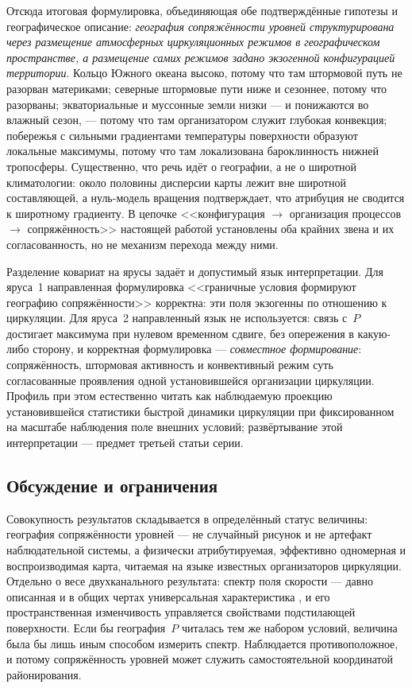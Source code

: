 \documentclass[11pt,a4paper]{article}
\begin{document}
Отсюда итоговая формулировка, объединяющая обе подтверждённые гипотезы и географическое описание: \emph{география сопряжённости уровней структурирована через размещение атмосферных циркуляционных режимов в географическом пространстве, а размещение самих режимов задано экзогенной конфигурацией территории}. Кольцо Южного океана высоко, потому что там штормовой путь не разорван материками; северные штормовые пути ниже и сезоннее, потому что разорваны; экваториальные и муссонные земли низки --- и понижаются во влажный сезон, --- потому что там организатором служит глубокая конвекция; побережья с сильными градиентами температуры поверхности образуют локальные максимумы, потому что там локализована бароклинность нижней тропосферы. Существенно, что речь идёт о географии, а не о широтной климатологии: около половины дисперсии карты лежит вне широтной составляющей, а нуль-модель вращения подтверждает, что атрибуция не сводится к широтному градиенту. В цепочке <<конфигурация $\to$ организация процессов $\to$ сопряжённость>> настоящей работой установлены оба крайних звена и их согласованность, но не механизм перехода между ними.

Разделение ковариат на ярусы задаёт и допустимый язык интерпретации. Для яруса~1 направленная формулировка <<граничные условия формируют географию сопряжённости>> корректна: эти поля экзогенны по отношению к циркуляции. Для яруса~2 направленный язык не используется: связь с~$P$ достигает максимума при нулевом временном сдвиге, без опережения в какую-либо сторону, и корректная формулировка --- \emph{совместное формирование}: сопряжённость, штормовая активность и конвективный режим суть согласованные проявления одной установившейся организации циркуляции. Профиль при этом естественно читать как наблюдаемую проекцию установившейся статистики быстрой динамики циркуляции при фиксированном на масштабе наблюдения поле внешних условий; развёртывание этой интерпретации --- предмет третьей статьи серии.

\subsection{Обсуждение и ограничения}
\label{sec:limitations}

Совокупность результатов складывается в определённый статус величины: география сопряжённости уровней --- не случайный рисунок и не артефакт наблюдательной системы, а физически атрибутируемая, эффективно одномерная и воспроизводимая карта, читаемая на языке известных организаторов циркуляции. Отдельно о весе двухканального результата: спектр поля скорости --- давно описанная и в общих чертах универсальная характеристика \cite{NastromGage1985,Lovejoy2011}, и его пространственная изменчивость управляется свойствами подстилающей поверхности. Если бы география~$P$ читалась тем же набором условий, величина была бы лишь иным способом измерить спектр. Наблюдается противоположное, и потому сопряжённость уровней может служить самостоятельной координатой районирования.
\end{document}

